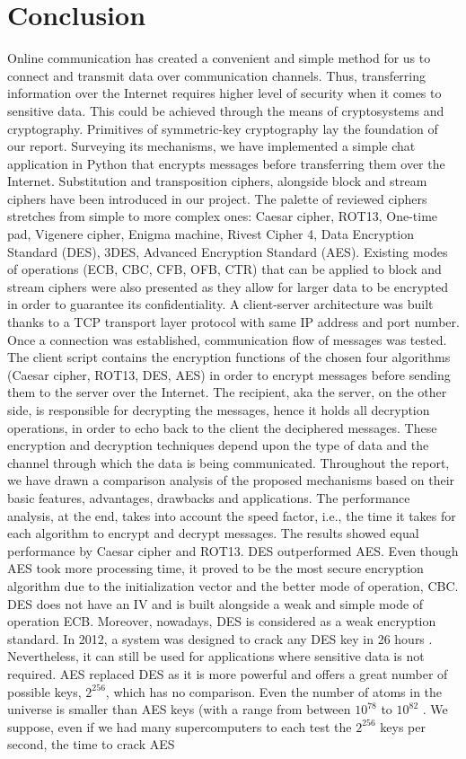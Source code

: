 \section{Conclusion}

Online communication has created a convenient and simple method for us to connect and transmit data over communication channels. Thus, transferring information over the Internet requires higher level of security when it comes to sensitive data. This could be achieved through the means of cryptosystems and cryptography. Primitives of symmetric-key cryptography lay the foundation of our report. Surveying its mechanisms, we have implemented a simple chat application in Python that encrypts messages before transferring them over the Internet. Substitution and transposition ciphers, alongside block and stream ciphers have been introduced in our project. The palette of reviewed ciphers stretches from simple to more complex ones: Caesar cipher, ROT13, One-time pad, Vigenere cipher, Enigma machine, Rivest Cipher 4, Data Encryption Standard (DES), 3DES, Advanced Encryption Standard (AES). Existing modes of operations (ECB, CBC, CFB, OFB, CTR) that can be applied to block and stream ciphers were also presented as they allow for larger data to be encrypted in order to guarantee its confidentiality. A client-server architecture was built thanks to a TCP transport layer protocol with same IP address and port number. Once a connection was established, communication flow of messages was tested. The client script contains the encryption functions of the chosen four algorithms (Caesar cipher, ROT13, DES, AES) in order to encrypt messages before sending them to the server over the Internet. The recipient, aka the server, on the other side, is responsible for decrypting the messages, hence it holds all decryption operations, in order to echo back to the client the deciphered messages. These encryption and decryption techniques depend upon the type of data and the channel through which the data is being communicated. Throughout the report, we have drawn a comparison analysis of the proposed mechanisms based on their basic features, advantages, drawbacks and applications. The performance analysis, at the end, takes into account the speed factor, i.e., the time it takes for each algorithm to encrypt and decrypt messages. The results showed equal performance by Caesar cipher and ROT13. DES outperformed AES. Even though AES took more processing time, it proved to be the most secure encryption algorithm due to the initialization vector and the better mode of operation, CBC. DES does not have an IV and is built alongside a weak and simple mode of operation ECB. Moreover, nowadays, DES is considered as a weak encryption standard. In 2012, a system was designed to crack any DES key in 26 hours \cite{crack.sh}. Nevertheless, it can still be used for applications where sensitive data is not required. AES replaced DES as it is more powerful and offers a great number of possible keys, $2^{256}$, which has no comparison. Even the number of atoms in the universe is smaller than AES keys (with a range from between $10^{78}$ to $10^{82}$ \cite{atoms}. We suppose, even if we had many supercomputers to each test the $2^{256}$ keys per second, the time to crack AES 